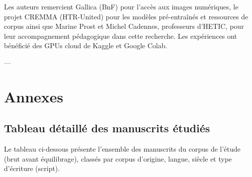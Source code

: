 ﻿\documentclass[twoside,twocolumn,10pt]{article}
\begin{document}
Les auteurs remercient Gallica (BnF) \cite{gallica2023} pour l'accès aux images numériques, le projet CREMMA \cite{cremma2022} (HTR-United) \cite{htr-united2022} pour les modèles pré-entraînés et ressources de corpus ainsi que Marine Prost et Michel Cadennes, professeurs d'HETIC, pour leur accompagnement pédagogique dans cette recherche. Les expériences ont bénéficié des GPUs cloud de Kaggle et Google Colab.

---
\nocite{*}
\printbibliography[heading=bibliography]

\clearpage
\onecolumn

\section{Annexes}
\begin{appendices}
\section{Tableau détaillé des manuscrits étudiés}
\label{annexe:manuscrits}

Le tableau ci-dessous présente l'ensemble des manuscrits du corpus de l'étude (brut avant équilibrage), classés par corpus d'origine, langue, siècle et type d'écriture (script).


\end{appendices}
\end{document}
